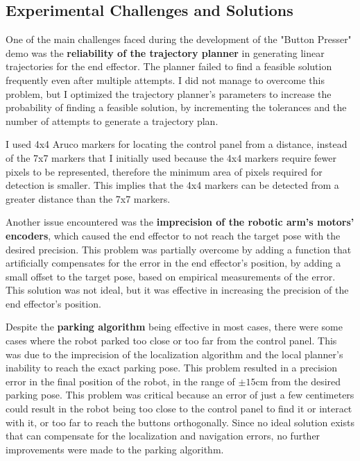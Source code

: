 \subsection{Experimental Challenges and Solutions}

One of the main challenges faced during the development of the "Button Presser" demo was the \textbf{reliability of the
trajectory planner} in generating linear trajectories for the end effector. The planner failed to find a feasible
solution frequently even after multiple attempts. I did not manage to overcome this problem, but I optimized
the trajectory planner's parameters to increase the probability of finding a feasible solution, by incrementing
the tolerances and the number of attempts to generate a trajectory plan. 

I used 4x4 Aruco markers for locating the control panel from a distance, instead of the 7x7 markers that I initially 
used because the 4x4 markers require fewer pixels to be represented, therefore the minimum area of pixels required
for detection is smaller. This implies that the 4x4 markers can be detected from a greater distance than the 7x7 markers.

Another issue encountered was the \textbf{imprecision of the robotic arm's motors' encoders}, which caused the end effector
to not reach the target pose with the desired precision. This problem was partially overcome by adding a function
that artificially compensates for the error in the end effector's position, by adding a small offset 
to the target pose, based on empirical measurements of the error. This solution was not ideal, but it was effective
in increasing the precision of the end effector's position.

Despite the \textbf{parking algorithm} being effective in most cases, there were some cases where the robot parked too close
or too far from the control panel. This was due to the imprecision of the localization algorithm and the
local planner's inability to reach the exact parking pose. This problem resulted in a precision error 
in the final position of the robot, in the range of $\pm 15$cm from the desired parking pose. This problem was
critical because an error of just a few centimeters could result in the robot being too close to the control panel
to find it or interact with it, or too far to reach the buttons orthogonally. Since no ideal solution exists that
can compensate for the localization and navigation errors, no further improvements were made to the parking algorithm.

